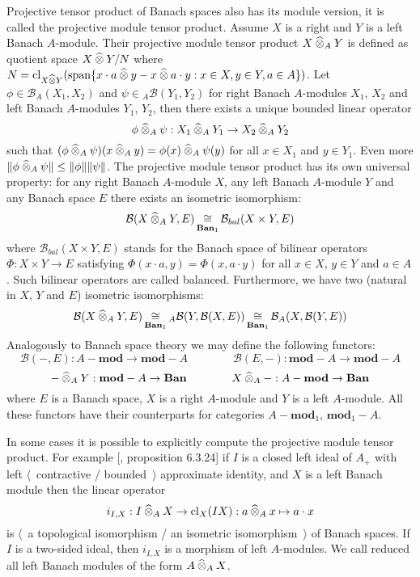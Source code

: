 Projective tensor product of Banach spaces also has its module version, it is
called the projective module tensor product. Assume $X$ is a right and $Y$ is a
left Banach $A$-module. Their projective module tensor product
$X\mathbin{\widehat{\otimes}}_{A}Y$ is defined as quotient space $X\mathbin{\widehat{\otimes}} Y / N$ where
$N
=\operatorname{cl}_{X\mathbin{\widehat{\otimes}} Y}(\operatorname{span} \{
  x\cdot a\mathbin{\widehat{\otimes}} y-x\mathbin{\widehat{\otimes}} a\cdot y
  :x\in X,y\in Y,a\in A
 \})$. 
Let $\phi\in\mathcal{B}_A(X_1,X_2)$ and $\psi\in{}_A\mathcal{B}(Y_1,Y_2)$ 
for right Banach $A$-modules $X_1$, $X_2$ and left 
Banach $A$-modules $Y_1$, $Y_2$, then there exists a unique bounded 
linear operator 
$$
\phi\mathbin{\widehat{\otimes}}_{A} \psi:X_1\mathbin{\widehat{\otimes}}_{A} Y_1\to X_2\mathbin{\widehat{\otimes}}_{A} Y_2
$$ 
such that
$(\phi\mathbin{\widehat{\otimes}}_{A} \psi)(x\mathbin{\widehat{\otimes}}_{A} y)=\phi(x)\mathbin{\widehat{\otimes}}_{A} \psi(y)$
for all $x\in X_1$ and $y\in Y_1$. Even more 
$\Vert \phi\mathbin{\widehat{\otimes}}_{A} \psi\Vert\leq\Vert \phi\Vert\Vert \psi\Vert$. 
The projective module tensor product has its own universal property: for any
right Banach $A$-module $X$, any left Banach $A$-module $Y$ and any Banach space
$E$ there exists an isometric isomorphism:
$$
\mathcal{B}(X\mathbin{\widehat{\otimes}}_{A}Y,E)
\mathop{\mathbin{\cong}}\limits_{\mathbf{Ban}_1}
\mathcal{B}_{bal}(X\times Y, E)
$$
where $\mathcal{B}_{bal}(X\times Y, E)$ stands for the Banach space of bilinear
operators $\Phi:X\times Y\to E$ satisfying $\Phi(x\cdot a,y)=\Phi(x,a\cdot y)$
for all $x\in X$, $y\in Y$ and $a\in A$. Such bilinear operators are called
balanced. Furthermore, we have two (natural in $X$, $Y$ and $E$) isometric
isomorphisms:
$$
\mathcal{B}(X\mathbin{\widehat{\otimes}}_{A}Y,E)
\mathop{\mathbin{\cong}}\limits_{\mathbf{Ban}_1}
{}_A\mathcal{B}(Y,\mathcal{B}(X,E))
\mathop{\mathbin{\cong}}\limits_{\mathbf{Ban}_1}
\mathcal{B}_A(X,\mathcal{B}(Y,E))
$$
Analogously to Banach space theory we may define the following functors:
$$
\mathcal{B}(-,E):A-\mathbf{mod}\to \mathbf{mod}-A
\qquad\qquad
\mathcal{B}(E,-):\mathbf{mod}-A\to \mathbf{mod}-A
$$
$$
-\mathbin{\widehat{\otimes}}_{A} Y:\mathbf{mod}-A\to\mathbf{Ban}
\qquad\qquad
X\mathbin{\widehat{\otimes}}_{A} -:A-\mathbf{mod}\to\mathbf{Ban}
$$
where $E$ is a Banach space, $X$ is a right $A$-module and $Y$ is a left
$A$-module. All these functors have their counterparts for categories
$A-\mathbf{mod}_1$, $\mathbf{mod}_1-A$. 

In some cases it is possible to explicitly compute the projective module tensor
product. For example [\cite{HelBanLocConvAlg}, proposition 6.3.24] if $I$ is a
closed left ideal of $A_+$ with left $\langle$~contractive / bounded~$\rangle$
approximate identity, and $X$ is a left Banach module then the linear operator 
$$
i_{I,X}
:I\mathbin{\widehat{\otimes}}_{A}X \to \operatorname{cl}_X(IX)
:a\mathbin{\widehat{\otimes}}_{A} x\mapsto a\cdot x
$$
is $\langle$~a topological isomorphism / an isometric isomorphism~$\rangle$ of
Banach spaces. If $I$ is a two-sided ideal, then $i_{I,X}$ is a morphism of left
$A$-modules. We call reduced all left Banach modules of the form
$A\mathbin{\widehat{\otimes}}_{A}X$. 

